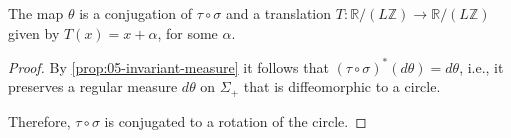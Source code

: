 \begin{theorem}
The map $\theta $ is a conjugation of $\tau\circ \sigma$ and a translation $T:\mathbb{R}/(L\mathbb{Z})\to \mathbb{R}/(L\mathbb{Z})$ given by $T(x)=x+\alpha$, for some $\alpha$.
\label{thm:05-rotation-cirle}
\end{theorem}

\begin{proof}
By \cref{prop:05-invariant-measure} it follows that $(\tau\circ \sigma)^{*}(d\theta)=d\theta$, i.e., it preserves a regular measure $d\theta$ on $\Sigma_+$ that is diffeomorphic to a circle. 

 

Therefore, $\tau\circ\sigma$ is conjugated to a rotation of the circle.
\end{proof}



 

 
